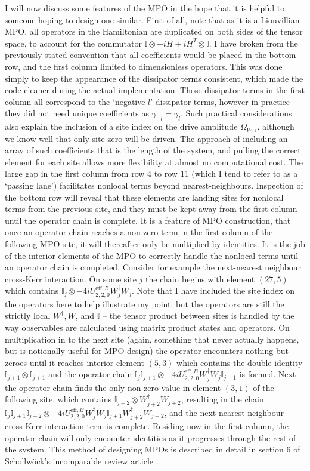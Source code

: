 I will now discuss some features of the MPO in the hope that it is helpful to someone hoping to design one similar. First of all, note that as it is a Liouvillian MPO, all operators in the Hamiltonian are duplicated on both sides of the tensor space, to account for the commutator \(\mathbb{I} \otimes -iH + iH^{T} \otimes \mathbb{I}\). I have broken from the previously stated convention that all coefficients would be placed in the bottom row, and the first column limited to dimensionless operators. This was done simply to keep the appearance of the dissipator terms consistent, which made the code cleaner during the actual implementation. Those dissipator terms in the first column all correspond to the `negative \(l\)' dissipator terms, however in practice they did not need unique coefficients as \(\gamma_{-l} = \gamma_{l}\). Such practical considerations also explain the inclusion of a site index on the drive amplitude \(\Omega_{W,i}\), although we know well that only site zero will be driven. The approach of including an array of such coefficients that is the length of the system, and pulling the correct element for each site allows more flexibility at almost no computational cost. The large gap in the first column from row 4 to row 11 (which I tend to refer to as a `passing lane') facilitates nonlocal terms beyond nearest-neighbours. Inspection of the bottom row will reveal that these elements are landing sites for nonlocal terms from the previous site, and they must be kept away from the first column until the operator chain is complete. It is a feature of MPO construction, that once an operator chain reaches a non-zero term in the first column of the following MPO site, it will thereafter only be multiplied by identities. It is the job of the interior elements of the MPO to correctly handle the nonlocal terms until an operator chain is completed. Consider for example the next-nearest neighbour cross-Kerr interaction. On some site \(j\) the chain begins with element \((27,5)\) which contains \(\mathbb{I}_{j} \otimes -4iU^{\mathrm{eff},B}_{2,2,0}W_{j}^{\dagger}W_{j}\). Note that I have included the site index on the operators here to help illustrate my point, but the operators are still the strictly local \(W^{\dagger}, W\), and \(\mathbb{I}\) -- the tensor product between sites is handled by the way observables are calculated using matrix product states and operators. On multiplication in to the next site (again, something that never actually happens, but is notionally useful for MPO design) the operator encounters nothing but zeroes until it reaches interior element \((5,3)\) which contains the double identity \(\mathbb{I}_{j+1} \otimes \mathbb{I}_{j+1}\) and the operator chain \(\mathbb{I}_{j}\mathbb{I}_{j+1} \otimes -4iU^{\mathrm{eff},B}_{2,2,0}W_{j}^{\dagger}W_{j}\mathbb{I}_{j+1}\) is formed. Next the operator chain finds the only non-zero value in element \((3,1)\) of the following site, which contains \(\mathbb{I}_{j+2} \otimes W_{j+2}^{\dagger}W_{j+2}\), resulting in the chain \(\mathbb{I}_{j}\mathbb{I}_{j+1}\mathbb{I}_{j+2} \otimes -4iU^{\mathrm{eff},B}_{2,2,0}W_{j}^{\dagger}W_{j}\mathbb{I}_{j+1}W_{j+2}^{\dagger}W_{j+2}\), and the next-nearest neighbour cross-Kerr interaction term is complete. Residing now in the first column, the operator chain will only encounter identities as it progresses through the rest of the system. This method of designing MPOs is described in detail in section 6 of Schollw\"{o}ck's incomparable review article \cite{Schollwock2011}.